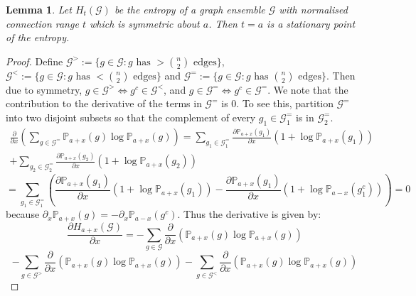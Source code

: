 \documentclass{article}
\newtheorem{lemma}{Lemma}
\newcommand{\graph}{\mathcal{G}}
\begin{document}
\begin{lemma}
    \label{lem:first}
    Let $H_t(\mathcal{G})$ be the entropy of a graph ensemble $\mathcal{G}$ with normalised connection range $t$ which is symmetric about $a$. Then $t=a$ is a stationary point of the entropy.
\end{lemma}
\begin{proof}
    Define $\graph^> := \{g \in \graph : g \text{ has }>\binom{n}{2} \text{ edges}\}$, $\graph^< := \{g \in \graph : g \text{ has }<\binom{n}{2} \text{ edges}\}$ and $\graph^= := \{g \in \graph : g \text{ has }\binom{n}{2} \text{ edges}\}$. Then due to symmetry, $g \in\graph^> \iff g^c \in \graph^<$, and $g \in \graph^= \iff g^c \in \graph^=$. We note that the contribution to the derivative of the terms in $\graph^=$ is 0. To see this, partition $\graph^=$ into two disjoint subsets so that the complement of every $g_1 \in \graph_1^=$ is in $\graph_2^=$.
    \begin{gather}
        \frac{\partial}{\partial x}\left(\sum_{g\in\mathcal{G}^=} \mathbb{P}_{a+x}(g)\log \mathbb{P}_{a+x}(g)\right) = \sum_{g_1\in\mathcal{G}_1^=} \frac{\partial \mathbb{P}_{a+x}(g_1)}{\partial x}\left(1+\log \mathbb{P}_{a+x}(g_1)\right) \nonumber \\
        + \sum_{g_2\in\mathcal{G}_2^=} \frac{\partial \mathbb{P}_{a+x}(g_2)}{\partial x}\left(1+\log \mathbb{P}_{a+x}(g_2)\right)
    \end{gather}
    \begin{equation}  
        =  \sum_{g_1\in\mathcal{G}_1^=} \left(\frac{\partial \mathbb{P}_{a+x}(g_1)}{\partial x}\left(1+\log \mathbb{P}_{a+x}(g_1)\right) - \frac{\partial \mathbb{P}_{a+x}(g_1)}{\partial x}\left(1+\log \mathbb{P}_{a-x}(g_1^c)\right)\right) = 0
    \end{equation}
    because $\partial_x \mathbb{P}_{a+x}(g) = -\partial_x \mathbb{P}_{a-x}(g^c)$. Thus the derivative is given by:
    \begin{equation}
        \frac{\partial H_{a+x}(\mathcal{G})}{\partial x} = -\sum_{g\in\mathcal{G}} \frac{\partial }{\partial x}\left(\mathbb{P}_{a+x}(g)\log \mathbb{P}_{a+x}(g) \right)
    \end{equation}
    \begin{equation}
        -\sum_{g\in\mathcal{G}^>} \frac{\partial }{\partial x}\left(\mathbb{P}_{a+x}(g)\log \mathbb{P}_{a+x}(g) \right) -\sum_{g\in\mathcal{G}^<} \frac{\partial }{\partial x}\left(\mathbb{P}_{a+x}(g)\log \mathbb{P}_{a+x}(g) \right)
    \end{equation}
    \begin{equation}

\end{equation}
\end{proof}
\end{document}

